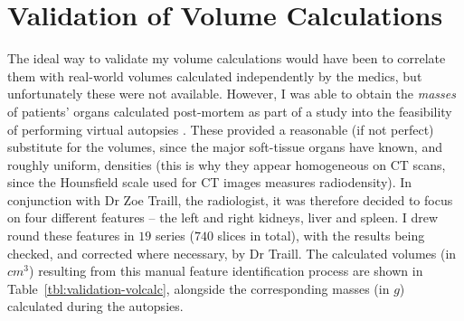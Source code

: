


\afterpage{\clearpage}
\newpage

\section{Validation of Volume Calculations}


The ideal way to validate my volume calculations would have been to correlate them with real-world volumes calculated independently by the medics, but unfortunately these were not available. However, I was able to obtain the \emph{masses} of patients' organs calculated post-mortem as part of a study into the feasibility of performing virtual autopsies \cite{?}. These provided a reasonable (if not perfect) substitute for the volumes, since the major soft-tissue organs have known, and roughly uniform, densities (this is why they appear homogeneous on CT scans, since the Hounsfield scale used for CT images measures radiodensity). In conjunction with Dr Zoe Traill, the radiologist, it was therefore decided to focus on four different features -- the left and right kidneys, liver and spleen. I drew round these features in $19$ series ($740$ slices in total), with the results being checked, and corrected where necessary, by Dr Traill. The calculated volumes (in $\mathit{cm}^3$) resulting from this manual feature identification process are shown in Table~\ref{tbl:validation-volcalc}, alongside the corresponding masses (in $g$) calculated during the autopsies.

